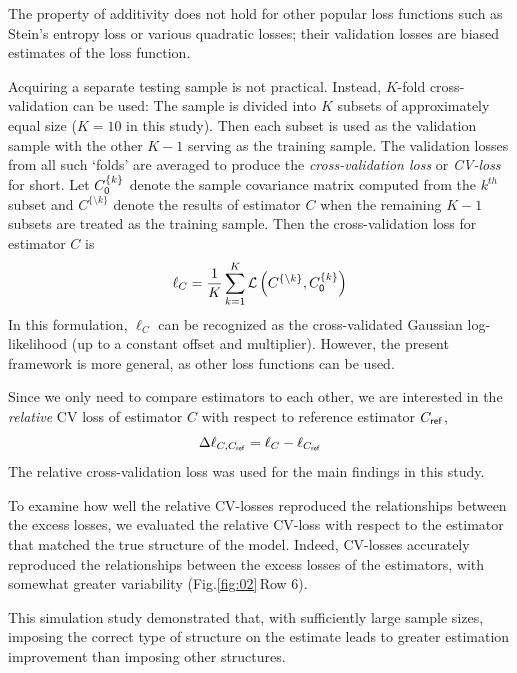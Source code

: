\documentclass[10pt]{article}
\newcommand{\sq}[1]{\lq#1\rq}
\newcommand{\figref}[2]{Fig.\;\ref{fig:#1}\,#2}
\newcommand{\loss}[1]{\mathcal L\left(#1\right)}
\begin{document}
The property of additivity does not hold for other popular loss functions such as Stein's entropy loss or various quadratic losses; their validation losses are biased estimates of the loss function. 

Acquiring a separate testing sample is not practical. Instead, $K$-fold cross-validation can be used: The sample is divided into $K$ subsets of approximately equal size ($K=10$ in this study).  Then each subset is used as the validation sample with the other $K-1$ serving as the training sample. The validation losses from all such \sq{folds} are averaged to produce the \emph{cross-validation loss} or \emph{CV-loss} for short.  Let $C_{\sf 0}^{\{k\}}$ denote the sample covariance matrix computed from the $k^{th}$ subset and $C^{\{\setminus k\}}$ denote the results of estimator $C$ when the remaining $K-1$ subsets are treated as the training sample. Then the cross-validation loss for estimator $C$ is
\begin{equation}\label{eq:cv-loss}
    \ell_C=\frac 1 K \sum\limits_{k=1}^K \loss{C^{\{\setminus k\}},C_{\sf 0}^{\{k\}}}
\end{equation}
In this formulation, $\ell_C$ can be recognized as the cross-validated Gaussian log-likelihood (up to a constant offset and multiplier). However, the present framework is more general, as other loss functions can be used.

Since we only need to compare estimators to each other, we are  interested in the \emph{relative} CV loss of estimator $C$ with respect to reference estimator $C_{\sf ref}$,
\begin{equation}\label{eq:rel-cv-loss}
    \Delta\ell_{C,C_{\sf ref}} = \ell_{C}-\ell_{C_{\sf ref}}
\end{equation}
The relative cross-validation loss was used for the main findings in this study. 

To examine how well the relative CV-losses reproduced the relationships between the excess losses, we evaluated the relative CV-loss with respect to the estimator that matched the true structure of the model. Indeed, CV-losses accurately reproduced the relationships between the excess losses of the estimators, with somewhat greater variability (\figref{02}{Row 6}). 

This simulation study demonstrated that, with sufficiently large sample sizes, imposing the correct type of structure on the estimate leads to greater estimation improvement than imposing other structures.
\end{document}
